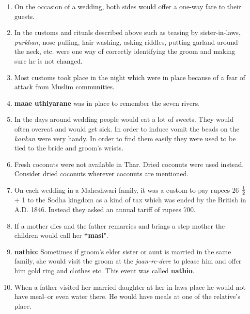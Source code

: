 \begin{center} \par\end{center}
\begin{enumerate}
\item On the occasion of a wedding, both sides would offer a one-way fare to
their guests.

\item In the customs and rituals described above such as teasing by
sister-in-laws, \textit{purkhan}, nose pulling, hair washing, asking riddles,
	putting garland around the neck, etc. were one way of correctly identifying
	the groom and making sure he is not changed.

\item Most customs took place in the night which were in place because of a
fear of attack from Muslim communities.

\item \textbf{maae uthiyarane} was in place to remember the seven rivers.

\item In the days around wedding people would eat a lot of sweets. They would
often overeat and would get sick. In order to induce vomit the beads on the
\textit{kankan} were very handy. In order to find them easily they were used to
be tied to the bride and groom's wrists.

\item Fresh coconuts were not available in Thar. Dried coconuts were used
instead. Consider dried coconuts wherever coconuts are mentioned.

\item On each wedding in a Maheshwari family, it was a custom to pay rupees 26
$1\over{2}$ + 1 to the Sodha kingdom as a kind of tax which was ended by the
British in A.D. 1846. Instead they asked an annual tariff of rupees 700.

\item If a mother dies and the father remarries and brings a step mother the
children would call her \textbf{``masi"}.

\item \textbf{nathio:} Sometimes if groom's elder sister or aunt is married in
the same family, she would visit the groom at the \textit{jaan-re-dere} to
please him and offer him gold ring and clothes etc. This event was called
\textbf{nathio}.

\item When a father visited her married daughter at her in-laws place he would
not have meal--or even water there. He would have meals at one of the
relative's place.


\end{enumerate}
